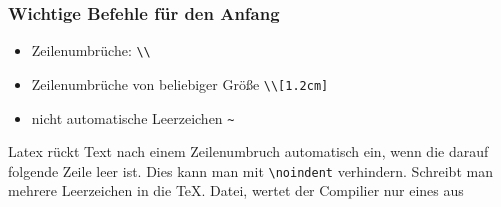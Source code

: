 \begin{frame}[fragile]
\frametitle{Wichtige Befehle für den Anfang}
\linespread{1.5}
\begin{itemize}
\item Zeilenumbrüche: \lstinline[style=Latex]+\\+ \\
\item Zeilenumbrüche von beliebiger Größe  \lstinline[style=Latex]+\\[1.2cm]+
\item nicht automatische Leerzeichen  \lstinline[style=Latex]+~+
\end{itemize}
Latex rückt Text nach einem Zeilenumbruch automatisch ein, wenn die darauf folgende Zeile leer ist. Dies kann man mit \lstinline[style=Latex]+\noindent+ verhindern.
Schreibt man mehrere Leerzeichen in die TeX. Datei, wertet der Compilier nur eines aus
\end{frame}

